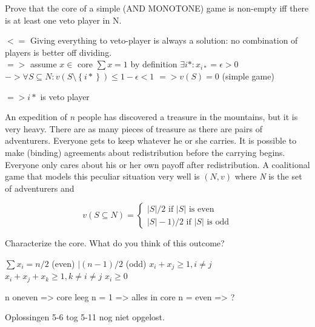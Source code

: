 \documentclass[../main.tex]{subfiles}
\begin{document}
\begin{question}
Prove that the core of a simple (AND MONOTONE) game is non-empty iff there is at least one veto player in N.
\end{question}

\begin{solution}
$<=$ Giving everything to veto-player is always a solution: no combination of players is better off dividing.\\

$=>$ assume $x \in $ core
$\sum x = 1$ by definition
$\exists i* : x_{i*} = \epsilon > 0$
$-> \forall S \subseteq N : v(S\setminus\left\{i*\right\}) \leq 1-\epsilon < 1$
$=> v(S) = 0$ (simple game)

$=> i*$ is veto player
\end{solution}

\begin{question}[Expedition]

An expedition of \textit{n} people has discovered a treasure in the mountains, but it is very heavy. There are as many pieces of treasure as there are pairs of adventurers. Everyone gets to keep whatever he or she carries. It is possible to make (binding) agreements about redistribution before the carrying begins. Everyone only cares about his or her own payoff after redistribution. A coalitional game that models this peculiar situation very well is $(N,v)$ where \textit{N} is the set of adventurers and

\begin{equation}
v(S \subseteq N) = \begin{cases}
|S|/2      \text{ if } |S| \text{ is even}\\
|S|-1)/2   \text{ if } |S| \text{ is odd}
\end{cases}
\end{equation}

Characterize the core. What do you think of this outcome?
\end{question}

\begin{solution}
$\sum x_i = n/2$ (even) $| (n-1)/2$ (odd)
$x_i + x_j \geq 1, i \neq j$
$x_i + x_j + x_k \geq 1, k \neq i \neq j$
$x_i \geq 0$

n oneven => core leeg
n = 1 => alles in core
n = even => ?
\end{solution}

Oplossingen 5-6 tog 5-11 nog niet opgelost.
\end{document}
